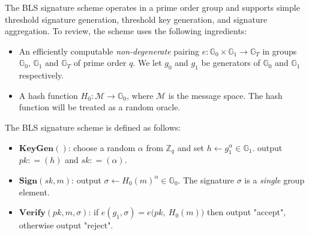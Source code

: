 The BLS signature scheme operates in a prime order group and supports simple threshold signature generation,
threshold key generation, and signature aggregation. To review, the scheme uses the following ingredients:

\newcommand{\G}{\mathbb{G}}
\newcommand{\Z}{\mathbb{Z}}
\newcommand{\adv}{{\cal A}}
\newcommand{\bdv}{{\cal B}}
\newcommand{\deq}{\mathrel{\mathop:}=}
\newcommand{\SK}{\mathit{sk}}
\newcommand{\PK}{\mathit{pk}}
\newcommand{\C}{\mathit{cert}}
\newcommand{\APK}{\mathit{apk}}
\newcommand{\DPK}{\mathit{\Delta pk}}
\newcommand{\MM}{\mathcal{M}}
\newcommand{\xwedge}{\, \operatorname{\text{$\wedge$}}\, }
\newcommand{\abs}[1]{\lvert #1 \rvert}
\newcommand{\Hm}{H_0}
\newcommand{\Hpk}{H_1}
\newcommand{\qHpk}{Q_{\Hpk}}
\newcommand{\qHm}{Q_{\Hm}}
\newcommand{\qsig}{Q_{\text{sig}}}

\begin{itemize}
    \item An efficiently computable \emph{non-degenerate} pairing $e:\G_0 \times \G_1 \to \G_T$
    in groups $\G_0$, $\G_1$ and $\G_T$ of prime order $q$. We let $g_0$ and $g_1$ be generators
    of $\G_0$ and $\G_1$ respectively.
    \item A hash function $H_0: \mathcal{M} \rightarrow \mathbb{G}_0$, where $\mathcal{M}$ is the message space.
    The hash function will be treated as a random oracle.
\end{itemize}

The BLS signature scheme is defined as follows:

\begin{itemize}
    \item $\textbf{KeyGen}()$: choose a random $\alpha$ from $\Z_q$ and set $h \gets g_1^\alpha \in \G_1$.
    output $\PK \deq (h)$ and $\SK \deq (\alpha)$.
    \item $\textbf{Sign}(\SK, m)$: output $\sigma \gets \Hm(m)^\alpha \in \G_0$.
    The signature $\sigma$ is a \emph{single} group element.
    \item $\textbf{Verify}(\PK,m,\sigma)$: if $e(g_1, \sigma) = e\big(\PK,\ \Hm(m)\big)$  then output "accept",
    otherwise output "reject".
\end{itemize}

